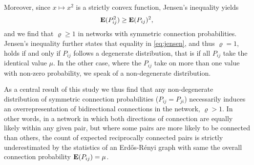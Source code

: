 Moreover, since $x \mapsto x^2$ is a strictly convex function, Jensen's inequality \cite{Jensen1906, Cover2006} yields
\begin{align}
\operatorname{\mathbf{E}}(P_{ij}^2) \geq \operatorname{\mathbf{E}}(P_{ij})^2, \label{eq:jensen}
\end{align}
and we find that $\varrho \geq 1$ in networks with symmetric connection probabilities. Jensen's inequality further states that equality in \eqref{eq:jensen}, and thus $\varrho = 1$, holds if and only if $P_{ij}$ follows a degenerate distribution, that is if all $P_{ij}$ take the identical value $\mu$. In the other case, where the $P_{ij}$ take on more than one value with non-zero probability, we speak of a non-degenerate distribution.

As a central result of this study we thus find that any non-degenerate distribution of symmetric connection probabilities ($P_{ij} = P_{ji}$) necessarily induces an overrepresentation of bidirectional connections in the network, $\varrho > 1$. In other words, in a network in which both directions of connection are equally likely within any given pair, but where some pairs are more likely to be connected than others, the count of expected reciprocally connected pairs is strictly underestimated by the statistics of an Erd\H{o}s-R\'{e}nyi graph with same the overall connection probability $\operatorname{\mathbf{E}}(P_{ij}) = \mu$.







